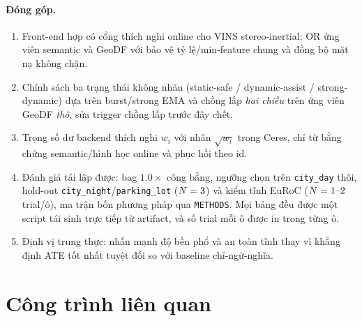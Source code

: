 \documentclass{ieeeaccess}
\begin{document}
\paragraph{Đóng góp.}
\begin{enumerate}
\item Front-end hợp có cổng thích nghi online cho VINS stereo-inertial: OR ứng viên semantic và GeoDF với bảo vệ tỷ lệ/min-feature chung và đồng bộ mặt nạ không chặn.
\item Chính sách ba trạng thái không nhãn (static-safe / dynamic-assist / strong-dynamic) dựa trên burst/strong EMA và chồng lấp \emph{hai chiều} trên ứng viên GeoDF \emph{thô}, sửa trigger chồng lấp trước đây chết.
\item Trọng số dư backend thích nghi \(w_i\) với nhân \(\sqrt{w_i}\) trong Ceres, chỉ từ bằng chứng semantic/hình học online và phục hồi theo id.
\item Đánh giá tái lập được: bag \(1.0\times\) công bằng, ngưỡng chọn trên \texttt{city\_day} thôi, hold-out \texttt{city\_night}/\texttt{parking\_lot} (\(N=3\)) và kiểm tĩnh EuRoC (\(N=\mbox{1--2}\) trial/ô), ma trận bốn phương pháp qua \texttt{METHODS}. Mọi bảng đều được một script tái sinh trực tiếp từ artifact, và số trial mỗi ô được in trong từng ô.
\item Định vị trung thực: nhấn mạnh độ bền phổ và an toàn tĩnh thay vì khẳng định ATE tốt nhất tuyệt đối so với baseline chỉ-ngữ-nghĩa.
\end{enumerate}

\section{Công trình liên quan}
\end{document}
